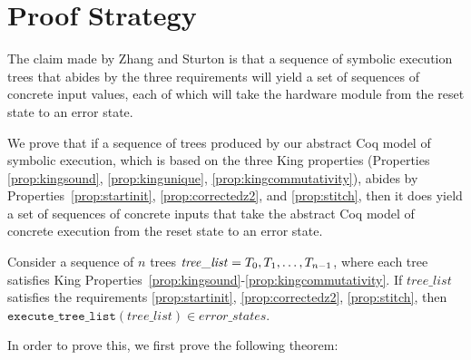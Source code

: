 \section{Proof Strategy}
The claim made by Zhang and Sturton is that a sequence of symbolic execution
trees that abides by the three requirements will yield a set of sequences of concrete
input values, each of which will take the hardware module from the reset state to an
error state.

We prove that if a sequence of trees produced by our abstract Coq model of symbolic
execution, which is based on the three King properties (Properties
\ref{prop:kingsound}, \ref{prop:kingunique}, \ref{prop:kingcommutativity}), abides by
Properties~\ref{prop:startinit}, \ref{prop:correctedz2}, and \ref{prop:stitch}, then
it does yield a set of sequences of concrete inputs that take the abstract Coq model of
concrete execution from the reset state to an error state.









\begin{theorem}
\label{thm:sufficiency} Consider a sequence of $n$ trees $\mathit{tree\_list} =
T_0, T_1, \ldots, T_{n-1}$, where each tree satisfies King
Properties~\ref{prop:kingsound}-\ref{prop:kingcommutativity}. If
$\mathit{tree\_list}$ satisfies the requirements \ref{prop:startinit},
\ref{prop:correctedz2}, \ref{prop:stitch}, then 
$\mathtt{execute\_tree\_list }(tree\_list) \in error\_states$.
\end{theorem}
 
 In order to prove this, we first prove the following theorem:

